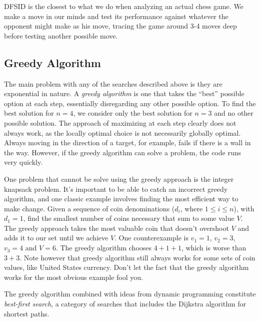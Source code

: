 \documentclass[11pt]{book}
\begin{document}
DFSID is the closest to what we do when analyzing an actual chess game. We make a move in our minds and test its performance against whatever the opponent might make as his move, tracing the game around 3-4 moves deep before testing another possible move.

\subsection{Greedy Algorithm}

The main problem with any of the searches described above is they are exponential in nature. A \textit{greedy algorithm} is one that takes the ``best'' possible option at each step, essentially disregarding any other possible option. To find the best solution for $n=4$, we consider only the best solution for $n=3$ and no other possible solution. The approach of maximizing at each step clearly does not always work, as the locally optimal choice is not necessarily globally optimal. Always moving in the direction of a target, for example, fails if there is a wall in the way. However, if the greedy algorithm can solve a problem, the code runs very quickly.

One problem that cannot be solve using the greedy approach is the integer knapsack problem. It's important to be able to catch an incorrect greedy algorithm, and one classic
example involves finding the most efficient way to make change. Given a sequence of coin denominations ($d_i$, where $1 \le i \le n$), with $d_1 = 1$, find the smallest number of coins necessary that sum to some value $V$. The greedy approach takes the most valuable coin that doesn't overshoot $V$ and adds it to our set until we achieve $V$. One counterexample is $v_1=1$, $v_2=3$, $v_3=4$ and $V = 6$. The greedy algorithm chooses $4+1+1$, which is worse than $3+3$. Note however that greedy algorithm still always works for some sets of coin values, like United States currency. Don't let the fact that the greedy algorithm works for the most obvious example fool you.

The greedy algorithm combined with ideas from dynamic programming constitute \textit{best-first search}, a category of searches that includes the Dijkstra algorithm for shortest paths.
\end{document}
